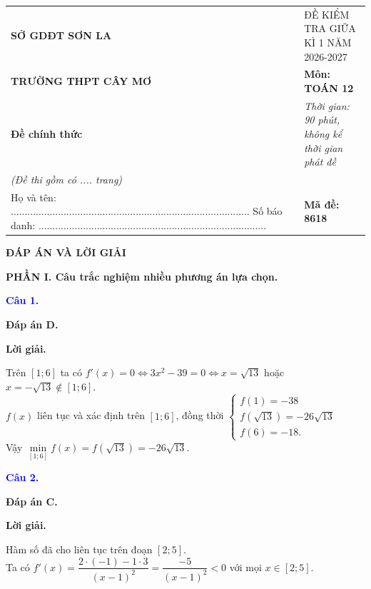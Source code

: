 \documentclass[12pt,a4paper]{article}
\begin{document}
\begin{center}
\begin{tabular}{p{}p{}}
\textbf{SỞ GDĐT SƠN LA} & ĐỀ KIỂM TRA GIỮA KÌ 1 NĂM 2026-2027 \tabularnewline
\textbf{TRƯỜNG THPT CÂY MƠ} & \textbf{Môn: TOÁN 12} \tabularnewline
\textbf{Đề chính thức} & \textit{Thời gian: 90 phút, không kể thời gian phát đề} \tabularnewline
\textit{(Đề thi gồm có .... trang)} & \tabularnewline
Họ và tên: ...................................................................................... \newline Số báo danh: .................................................................................. & \textbf{Mã đề: 8618} \tabularnewline
\end{tabular}
\end{center}
\vspace{0.5cm}

\begin{center}
{\Large\textbf{ĐÁP ÁN VÀ LỜI GIẢI}}
\end{center}

\noindent\textbf{PHẦN I. Câu trắc nghiệm nhiều phương án lựa chọn.}

\medskip

\noindent\textcolor{blue}{\textbf{Câu 1.}}

\noindent \textbf{Đáp án D.}

\noindent\textbf{Lời giải.}

Trên $[1;6]$ ta có $f'(x)=0\Leftrightarrow 3x^2-39=0\Leftrightarrow x=\sqrt{13}$ hoặc $x=-\sqrt{13}\not\in[1;6]$.\\
$f(x)$ liên tục và xác định trên $[1;6]$, đồng thời $\begin{cases} f(1)=-38 \\f\left (\sqrt{13}\right )=-26\sqrt{13}\\f(6)=-18. \end{cases}$\\

	Vậy $\min\limits_{[1;6]}f(x)=f\left (\sqrt{13}\right )=-26\sqrt{13}$.

\medskip
\noindent\textcolor{blue}{\textbf{Câu 2.}}

\noindent \textbf{Đáp án C.}

\noindent\textbf{Lời giải.}

Hàm số đã cho liên tục trên đoạn $[2;5]$.\\

		Ta có $f'(x)=\dfrac{2\cdot(-1)-1\cdot 3}{(x-1)^2}=\dfrac{-5}{(x-1)^2}<0$ với mọi $x\in [2;5]$.\\
\end{document}

